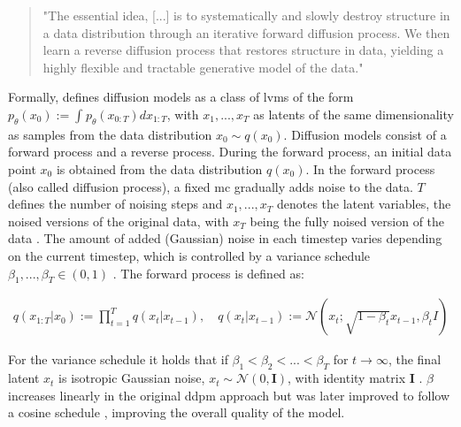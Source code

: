 \begin{quotation}
  "The essential idea, [...] is to systematically and slowly destroy structure in a data distribution through an iterative forward diffusion process. 
  We then learn a reverse diffusion process that restores structure in data, yielding a highly flexible and tractable generative \gls{model} of the data." \cite[p. 1]{sohl-dickstein2015DeepUnsupervisedLearning}
\end{quotation}

Formally, \textcite{ho2020DenoisingDiffusionProbabilistic} defines diffusion models as a class of \glspl{lvm} of the form $p_\theta(x_0):= \int_{}^{}p_\theta(x_{0:T})dx_{1:T}$,
with $x_1, ..., x_T$ as latents of the same dimensionality as samples from the data distribution $x_0 \sim q(x_0)$.
Diffusion models consist of a forward process and a reverse process.
During the forward process, an initial data point $x_0$ is obtained from the data distribution $q(x_0)$.
In the forward process (also called diffusion process), a fixed \gls{mc} gradually adds noise to the data.
$T$ defines the number of noising steps and $x_1,...,x_T$ denotes the latent variables, \ie the noised versions of the original data, with $x_T$ being the fully noised version of the data \cite{ho2020DenoisingDiffusionProbabilistic}.
The amount of added (Gaussian) noise in each timestep varies depending on the current timestep, which is controlled by a variance schedule $\beta_1, ..., \beta_T \in (0,1)$ \cite{ho2020DenoisingDiffusionProbabilistic}.
The forward process is defined as:

\begin{equation}
  \label{eqn:forwards_1}
  \begin{align*}
    q(x_{1:T} | x_0) := \prod_{t=1}^T q(x_t | x_{t-1}), \quad
    q(x_t | x_{t-1}) := \mathcal{N}(x_t; \sqrt{1 - \beta_t} x_{t-1}, \beta_t I)
  \end{align*}
\end{equation}

For the variance schedule it holds that if $\beta_1 < \beta_2 < ... < \beta_T$ for $t\rightarrow\infty$, the final latent $x_t$ is isotropic Gaussian noise, \ie $x_t \sim \mathcal{N}(0, \textbf{I})$, with identity matrix $\textbf{I}$ \cite{zbinden2022ImplementingExperimentingDiffusion}.
$\beta$ increases linearly in the original \gls{ddpm} approach \cite{ho2020DenoisingDiffusionProbabilistic} but was later improved to follow a cosine schedule \cite{nichol2021ImprovedDenoisingDiffusion}, improving the overall quality of the \gls{model}.

